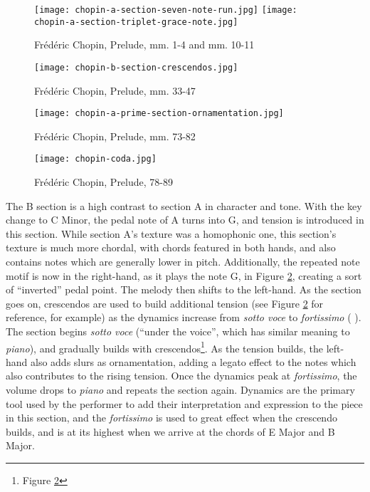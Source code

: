 \begin{figure}
  \centering
  \texttt{[image: chopin-a-section-seven-note-run.jpg]}
  \texttt{[image: chopin-a-section-triplet-grace-note.jpg]}
  \caption{Frédéric Chopin, Prelude, mm. 1-4 and mm. 10-11}
  \label{fig:chopin-a-section-examples-ornamentation}
\end{figure}

\begin{figure}
  \centering
  \texttt{[image: chopin-b-section-crescendos.jpg]}
  \caption{Frédéric Chopin, Prelude, mm. 33-47}
  \label{fig:chopin-b-section-crescendos}
\end{figure}

\begin{figure}
  \centering
  \texttt{[image: chopin-a-prime-section-ornamentation.jpg]}
  \caption{Frédéric Chopin, Prelude, mm. 73-82}
  \label{fig:chopin-a-prime-section-ornamentation}
\end{figure}

\begin{figure}
  \centering
  \texttt{[image: chopin-coda.jpg]}
  \caption{Frédéric Chopin, Prelude, 78-89}
  \label{fig:chopin-coda}
\end{figure}

The B section is a high contrast to section A in character and tone. With the key change to C\musSharp{} Minor, the pedal note of A\musFlat{} turns into G\musSharp{}, and tension is introduced in this section. While section A's texture was a homophonic one, this section's texture is much more chordal, with chords featured in both hands, and also contains notes which are generally lower in pitch. Additionally, the repeated note motif is now in the right-hand, as it plays the note G\musSharp{}, in Figure \ref{fig:chopin-b-section-crescendos}\autocite{Hansen_1973}, creating a sort of ``inverted'' pedal point. The melody then shifts to the left-hand. As the section goes on, crescendos are used to build additional tension (see Figure \ref{fig:chopin-b-section-crescendos}\autocite{Hansen_1973} for reference, for example) as the dynamics increase from \textit{sotto voce} to \textit{fortissimo} ( ). The section begins \textit{sotto voce} (``under the voice'', which has similar meaning to \textit{piano}), and gradually builds with crescendos\footnote{Figure \ref{fig:chopin-b-section-crescendos}}\autocite{Hansen_1973}. As the tension builds, the left-hand also adds slurs as ornamentation, adding a legato effect to the notes which also contributes to the rising tension. Once the dynamics peak at \textit{fortissimo}, the volume drops to \textit{piano} and repeats the section again. Dynamics are the primary tool used by the performer to add their interpretation and expression to the piece in this section, and the \textit{fortissimo} is used to great effect when the crescendo builds, and is at its highest when we arrive at the chords of E Major and B Major.

